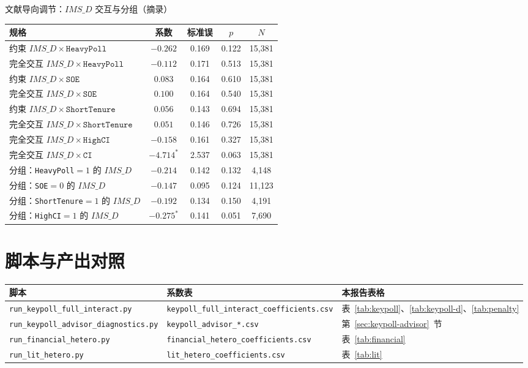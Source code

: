 \documentclass[11pt]{article}
\begin{document}
\begin{center}
\begin{threeparttable}
\caption{文献导向调节：\(IMS\_D\) 交互与分组（摘录）}
\begin{tabular}{lcccc}
\toprule
规格 & 系数 & 标准误 & \(p\) & \(N\) \\
\midrule
约束 \(IMS\_D\times\texttt{HeavyPoll}\) & \(-0.262\) & 0.169 & 0.122 & 15,381 \\
完全交互 \(IMS\_D\times\texttt{HeavyPoll}\) & \(-0.112\) & 0.171 & 0.513 & 15,381 \\
约束 \(IMS\_D\times\texttt{SOE}\) & \(0.083\) & 0.164 & 0.610 & 15,381 \\
完全交互 \(IMS\_D\times\texttt{SOE}\) & \(0.100\) & 0.164 & 0.540 & 15,381 \\
约束 \(IMS\_D\times\texttt{ShortTenure}\) & \(0.056\) & 0.143 & 0.694 & 15,381 \\
完全交互 \(IMS\_D\times\texttt{ShortTenure}\) & \(0.051\) & 0.146 & 0.726 & 15,381 \\
完全交互 \(IMS\_D\times\texttt{HighCI}\) & \(-0.158\) & 0.161 & 0.327 & 15,381 \\
完全交互 \(IMS\_D\times\texttt{CI}\) & \(-4.714^{*}\) & 2.537 & 0.063 & 15,381 \\
分组：\texttt{HeavyPoll}\(=1\) 的 \(IMS\_D\) & \(-0.214\) & 0.142 & 0.132 & 4,148 \\
分组：\texttt{SOE}\(=0\) 的 \(IMS\_D\) & \(-0.147\) & 0.095 & 0.124 & 11,123 \\
分组：\texttt{ShortTenure}\(=1\) 的 \(IMS\_D\) & \(-0.192\) & 0.134 & 0.150 & 4,191 \\
分组：\texttt{HighCI}\(=1\) 的 \(IMS\_D\) & \(-0.275^{*}\) & 0.141 & 0.051 & 7,690 \\
\bottomrule
\end{tabular}
\end{threeparttable}
\end{center}

\section{脚本与产出对照}

\begin{center}
\footnotesize
\begin{tabular}{lll}
\toprule
脚本 & 系数表 & 本报告表格 \\
\midrule
\texttt{run\_keypoll\_full\_interact.py} & \texttt{keypoll\_full\_interact\_coefficients.csv} & 表~\ref{tab:keypoll}、\ref{tab:keypoll-d}、\ref{tab:penalty} \\
\texttt{run\_keypoll\_advisor\_diagnostics.py} & \texttt{keypoll\_advisor\_*.csv} & 第~\ref{sec:keypoll-advisor}~节 \\
\texttt{run\_financial\_hetero.py} & \texttt{financial\_hetero\_coefficients.csv} & 表~\ref{tab:financial} \\
\texttt{run\_lit\_hetero.py} & \texttt{lit\_hetero\_coefficients.csv} & 表~\ref{tab:lit} \\
\bottomrule
\end{tabular}
\end{center}
\end{document}

